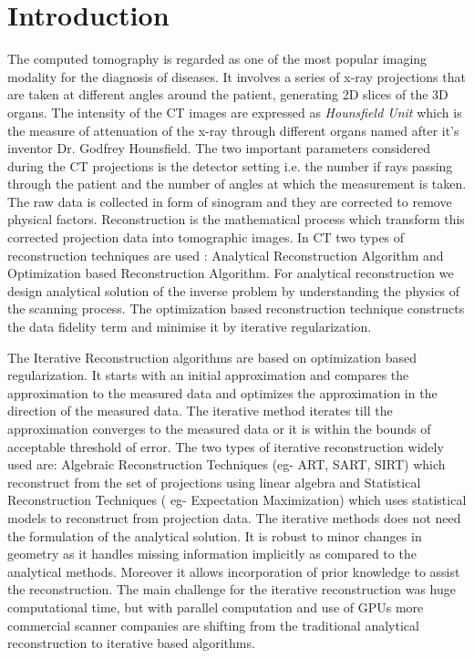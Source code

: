 \documentclass[12pt]{article}
\newcommand{\noin}{\noindent}
\begin{document}
	\section{Introduction}
	\noin The computed tomography is regarded as one of the most popular imaging modality for the diagnosis of diseases. It involves a series of x-ray projections that are taken at different angles around the patient, generating 2D slices of the 3D organs. The intensity  of the CT images are expressed as \emph{Hounsfield Unit} which is the measure of attenuation of the x-ray through different organs named after it's inventor Dr. Godfrey Hounsfield. The two important parameters considered during the CT projections is the detector setting i.e. the number if rays passing through the patient and the number of angles at which the measurement is taken. The raw data is collected in form of sinogram and they are corrected to remove physical factors. Reconstruction is the mathematical process which transform this corrected projection data into tomographic images. In CT two types of reconstruction techniques are used : Analytical Reconstruction Algorithm and Optimization based Reconstruction Algorithm. For analytical reconstruction we design analytical solution of the inverse problem by understanding the physics of the scanning process. The optimization based reconstruction technique constructs the data fidelity term and minimise it by iterative regularization. 
	
	\vspace{0.2in}
	
	\noin The Iterative Reconstruction algorithms are based on optimization based regularization. It starts with an initial approximation and compares the approximation to the measured data and optimizes the approximation in the direction of the measured data. The iterative method iterates till the approximation converges to the measured data or it is within the bounds of acceptable threshold of error. The two types of iterative reconstruction widely used are: Algebraic Reconstruction Techniques (eg- ART, SART, SIRT) which reconstruct from the set of projections using linear algebra and Statistical Reconstruction Techniques ( eg- Expectation Maximization) which uses statistical models to reconstruct from projection data. The iterative methods does not need the formulation of the analytical solution. It is robust to minor changes in geometry as it handles missing information implicitly as compared to the analytical methods. Moreover it allows incorporation of prior knowledge to assist the reconstruction. The main challenge for the iterative reconstruction was huge computational time, but with parallel computation and use of GPUs more commercial scanner companies are shifting from the traditional analytical reconstruction to iterative based algorithms.
	
\end{document}
